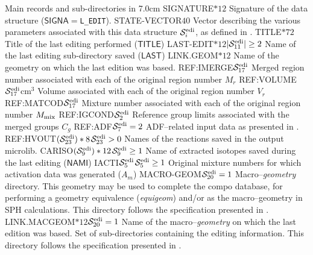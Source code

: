 \begin{DescriptionEnregistrement}{Main records and sub-directories in }{7.0cm}
\CharEnr
  {SIGNATURE}{$*12$}
  {Signature of the data structure ($\mathsf{SIGNA}=${\tt L\_EDIT}).}
\IntEnr
  {STATE-VECTOR}{$40$}
  {Vector describing the various parameters associated with this data structure $\mathcal{S}^{\rm edi}_{i}$,
  as defined in .}
\CharEnr
  {TITLE}{$*72$}
  {Title of the last editing performed ($\mathsf{TITLE}$) }
\OptCharEnr
  {LAST-EDIT}{$*12$}{$|\mathcal{S}^{\rm edi}_{11}|\ge 2$}
  {Name of the last editing sub-directory saved ($\mathsf{LAST}$)}
\CharEnr
  {LINK.GEOM}{$*12$}
  {Name of the {\sc geometry} on which the last edition was based.}
\IntEnr
  {REF:IMERGE}{$\mathcal{S}^{\rm edi}_{17}$}
  {Merged region number associated with each of the original region number $M_{r}$}
\RealEnr
  {REF:VOLUME}{$\mathcal{S}^{\rm edi}_{17}$}{cm$^{3}$}
  {Volume associated with each of the original region number $V_{r}$}
\IntEnr
  {REF:MATCOD}{$\mathcal{S}^{\rm edi}_{17}$}
  {Mixture number associated with each of the original region number $M_{\rm mix}$}
\IntEnr
  {REF:IGCOND}{$\mathcal{S}^{\rm edi}_{2}$}
  {Reference group limits associated with the merged groups $C_{g}$}
\OptDirEnr
  {REF:ADF}{$\mathcal{S}^{\rm edi}_{7} = 2$}
  {ADF--related input data as presented in .}
\OptCharEnr
  {REF:HVOUT}{$(\mathcal{S}^{\rm edi}_{23})*8$}{$\mathcal{S}^{\rm edi}_{23} > 0$}
  {Names of the reactions saved in the output microlib.}
\OptCharEnr
  {CARISO}{$(\mathcal{S}^{\rm edi}_{9})*12$}{$\mathcal{S}^{\rm edi}_{9}\ge 1$}
  {Name of extracted isotopes saved during the last editing ($\mathsf{NAMI}$)}
\OptIntEnr
  {IACTI}{$\mathcal{S}^{\rm edi}_{5}$}{$\mathcal{S}^{\rm edi}_{5}\ge 1$}
  {Original mixture numbers for which activation data was generated ($A_{m}$)}
\OptDirEnr
  {MACRO-GEOM}{$\mathcal{S}^{\rm edi}_{20} = 1$}
  {Macro--{\sl geometry} directory. This geometry may be used to complete the {\sc compo} database, for performing
  a geometry equivalence ({\sl equigeom}) and/or as the macro--geometry in SPH calculations. This directory follows
  the specification presented in .}
\OptCharEnr
  {LINK.MACGEOM}{$*12$}{$\mathcal{S}^{\rm edi}_{20} = 1$}
  {Name of the macro--{\sl geometry} on which the last edition was based.}
\DirVar
  {}
  {Set of sub-directories containing the editing information. This directory follows
  the specification presented in .}
\end{DescriptionEnregistrement}

